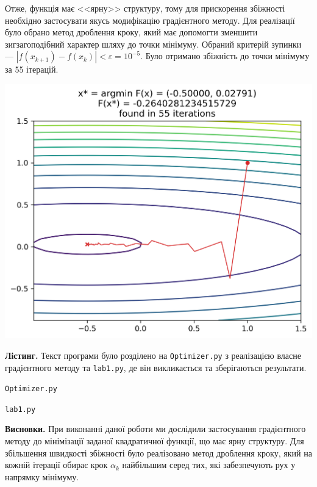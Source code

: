 \documentclass{extreport}
\begin{document}
Отже, функція має <<ярну>> структуру, тому для прискорення
збіжності необхідно застосувати якусь модифікацію градієнтного методу.
Для реалізації було обрано метод дроблення кроку, який має допомогти зменшити 
зигзагоподібний характер шляху до точки мінімуму.
Обраний критерій зупинки --- $\left| f(x_{k+1}) - f(x_k)\right| < \varepsilon = 10^{-5}$.
Було отримано збіжність до точки мінімуму за 55 ітерацій.
\begin{center}
    \includegraphics[scale = 0.8]{contour_final.png}
\end{center}

\noindent\textbf{Лістинг.}
Текст програми було розділено на \texttt{Optimizer.py} з реалізацією
власне градієнтного методу та \texttt{lab1.py}, де він викликається та зберігаються результати.

\noindent\texttt{Optimizer.py}


\noindent\texttt{lab1.py}


\noindent\textbf{Висновки.} При виконанні даної роботи ми дослідили
застосування градієнтного методу до мінімізації заданої квадратичної функції, що має
ярну структуру. Для збільшення швидкості збіжності було реалізовано метод дроблення кроку,
який на кожній ітерації обирає крок $\alpha_k$ найбільшим серед тих, які забезпечують рух
у напрямку мінімуму.
\end{document}
